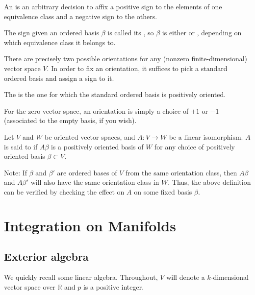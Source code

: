 \documentclass[12pt]{article}
\begin{document}
\begin{defn}
	An  is an arbitrary decision to affix a positive sign to the elements of one equivalence class and a negative sign to the others.

	The sign given an ordered basis $\beta$ is called its , so $\beta$ is either  or , depending on which equivalence class it belongs to. 
\end{defn}

There are precisely two possible orientations for any (nonzero finite-dimensional) vector space $V$. In order to fix an orientation, it suffices to pick a standard ordered basis and assign a sign to it.

The  is the one for which the standard ordered basis is positively oriented.

For the zero vector space, an orientation is simply a choice of $+1$ or $-1$ (associated to the empty basis, if you wish).


\begin{defn}
	Let $V$ and $W$ be oriented vector spaces, and $A : V \to W$ be a linear isomorphism. $A$ is said to  if $A \beta$ is a positively oriented basis of $W$ for any choice of positively oriented basis $\beta \subset V$.
\end{defn}
Note: If $\beta$ and $\beta'$ are ordered bases of $V$ from the same orientation class, then $A \beta$ and $A \beta'$ will also have the same orientation class in $W$. Thus, the above definition can be verified by checking the effect on $A$ on some fixed basis $\beta$.

\section{Integration on Manifolds}

\subsection{Exterior algebra}

We quickly recall some linear algebra. Throughout, $V$ will denote a $k$-dimensional vector space over $\mathbb{R}$ and $p$ is a positive integer.
\end{document}
